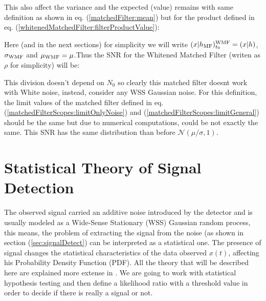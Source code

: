 
\newp This also affect the variance and the expected (value) remains with same definition as shown in eq. (\ref{matchedFilter:mean}) but for the product defined in eq. (\ref{whitenedMatchedFilter:filterProductValue}):



\newp Here (and in the next sections) for simplicity we will write $(x|h_{\text{MF}})^{\text{WMF}}_{t_0} = (x|h)$, $\sigma_{\text{WMF}}$ and $\mu_{\text{WMF}} = \mu$.Thus the SNR for the Whitened Matched Filter (writen as $\rho$ for simplicity) will be:


\newp This division doesn't depend on $N_0$ so clearly this matched filter doesnt work with White noise, instead, consider any WSS Gaussian noise. For this definition, the limit values of the matched filter defined in eq. (\ref{matchedFilterScopes:limitOnlyNoise}) and (\ref{matchedFilterScopes:limitGeneral}) should be the same but due to numerical computations, could be not exactly the same. This SNR has the same distribution than before $\mathcal{N}(\mu / \sigma, 1)$.

\section{Statistical Theory of Signal Detection}{\label{statTheoSigDet}}
\newp The observed signal carried an additive noise introduced by the detector and is usually modeled as a Wide-Sense Stationary (WSS) Gaussian random process, this means, the problem of extracting the signal from the noise (as shown in section (\ref{sec:signalDetect}) can be interpreted as a statistical one. The presence of signal changes the statistical characteristics of the data observed $x(t)$, affecting his Probability Density Function (PDF). 
\newp All the theory that will be described here are explained more extense in \citep{ligo-gauss-case, mit-course-sigSysAndInfer, ligo-1992}.
\newp We are going to work with statistical hypothesis testing and then define a likelihood ratio with a threshold value in order to decide if there is really a signal or not.

